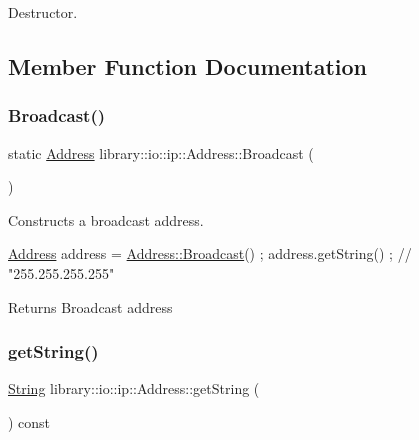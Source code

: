 Destructor. 



\subsection{Member Function Documentation}
\mbox{\label{classlibrary_1_1io_1_1ip_1_1_address_af08e4f162c4e91922edff360e0a1e198}} 
\subsubsection{\texorpdfstring{Broadcast()}{Broadcast()}}
{\footnotesize\ttfamily static \hyperlink{classlibrary_1_1io_1_1ip_1_1_address}{Address} library\+::io\+::ip\+::\+Address\+::\+Broadcast (\begin{DoxyParamCaption}{ }\end{DoxyParamCaption})\hspace{0.3cm}{\ttfamily [static]}}



Constructs a broadcast address. 


\begin{DoxyCode}
\hyperlink{classlibrary_1_1io_1_1ip_1_1_address_ab968d468b8bc2ba8f48fd2b6784832fe}{Address} address = \hyperlink{classlibrary_1_1io_1_1ip_1_1_address_af08e4f162c4e91922edff360e0a1e198}{Address::Broadcast}() ;
address.getString() ; \textcolor{comment}{// "255.255.255.255"}
\end{DoxyCode}


\begin{DoxyReturn}{Returns}
Broadcast address 
\end{DoxyReturn}
\mbox{\label{classlibrary_1_1io_1_1ip_1_1_address_aaa3c07764609a34d9f80df26981cad45}} 
\subsubsection{\texorpdfstring{get\+String()}{getString()}}
{\footnotesize\ttfamily \hyperlink{namespacelibrary_1_1io_1_1ip_a2ac70ed8dfa9969304e09cead6a39459}{String} library\+::io\+::ip\+::\+Address\+::get\+String (\begin{DoxyParamCaption}{ }\end{DoxyParamCaption}) const}




